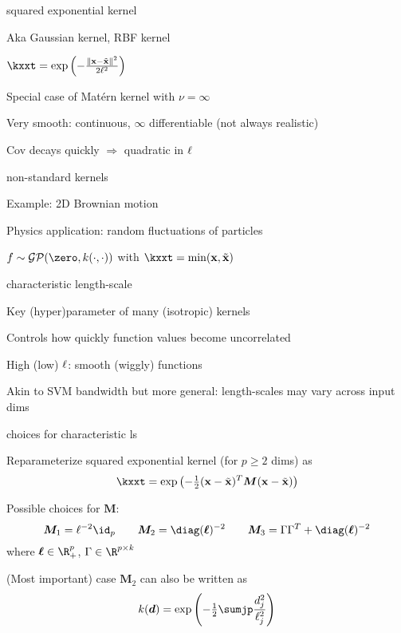 \documentclass[11pt,compress,t,notes=noshow, xcolor=table]{beamer}
\begin{document}
\begin{framei}{squared exponential kernel}
\item Aka Gaussian kernel, RBF kernel
\item $\kxxt = \exp \left(-\frac{\xxtnorm^2}{2\ls^2} \right)$
\item Special case of Matérn kernel with $\nu = \infty$
\item Very smooth: continuous, $\infty$ differentiable (not always realistic)
\item Cov decays quickly $\Rightarrow$ quadratic in $\ell$
\end{framei}

\begin{framei}[sep=S]{non-standard kernels}
\item Example: 2D Brownian motion
\item Physics application: random fluctuations of particles
\item $f \sim \GPzk$ with $ \kxxt = \min (\xv, \xtil)$
\vfill
{}
\end{framei}

\begin{framei}[sep=L]{characteristic length-scale}
\item Key (hyper)parameter of many (isotropic) kernels
\item Controls how quickly function values become uncorrelated
\item High (low) $\ell$: smooth (wiggly) functions
\vfill
{}
\item Akin to SVM bandwidth but more general: length-scales may vary across input dims
\end{framei}

\begin{framei}[sep=L]{choices for characteristic ls}
\item Reparameterize squared exponential kernel (for $p \geq 2$ dims) as
$$
\kxxt = \exp \left(- \tfrac{1}{2}(\xv - \xtil)^T\bm{M} (\xv - \xtil )\right)
$$
\item Possible choices for $\bm{M}$:
$$
\bm{M}_1 = \ls^{-2}\id_p \qquad \bm{M}_2 = \diag(\bm{\ls})^{-2} \qquad \bm{M}_3 = \Gamma \Gamma^T + \diag(\bm{\ls})^{-2}
$$
where $\bm{\ls} \in \R^p_+$, $\Gamma \in \R^{p \times k}$ 
\item (Most important) case $\bm{M}_2$ can also be written as
$$
  k(\bm{d}) = \exp \left(- \tfrac{1}{2} \sumjp \frac{d_j^2}{\ell_j^2} \right)
$$
\end{framei}
\end{document}
